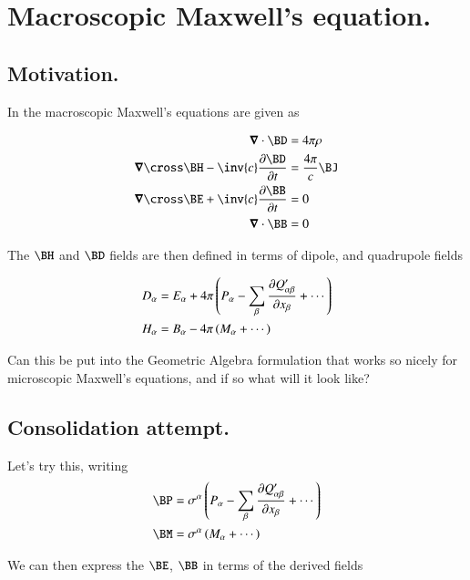 \chapter{Macroscopic Maxwell's equation.}
\label{chap:macroscopicMaxwell}
\date{ May 28, 2009.  $RCSfile: macroscopicMaxwell.tex,v $ Last $Revision: 1.8 $ $Date: 2009/06/14 17:59:59 $ }

\section{Motivation. }

In \cite{jackson1975cew} the macroscopic Maxwell's equations are given as

\begin{align}\label{eqn:macroMax:MaxwellMixedFields}
\spacegrad \cdot \BD &= 4 \pi \rho \\
\spacegrad \cross \BH - \inv{c} \PD{t}{\BD} &= \frac{4 \pi}{c} \BJ \\
\spacegrad \cross \BE + \inv{c} \PD{t}{\BB} &= 0 \\
\spacegrad \cdot \BB &= 0
\end{align}

The $\BH$ and $\BD$ fields are then defined in terms of dipole, and quadrupole
fields

\begin{align}\label{eqn:macroMax:dipoleCoordinates}
D_\alpha &= E_\alpha + 4\pi \left( P_\alpha - \sum_\beta \PD{x_\beta}{Q'_{\alpha\beta}} + \cdots\right) \\
H_\alpha &= B_\alpha - 4\pi \left( M_\alpha + \cdots\right)
\end{align}

Can this be put into the Geometric Algebra formulation that works so
nicely for microscopic Maxwell's equations, and if so what will it look like?

\section{Consolidation attempt. }

Let's try this, writing
\begin{align}
\BP &= \sigma^\alpha \left( P_\alpha - \sum_\beta \PD{x_\beta}{Q'_{\alpha\beta}} + \cdots\right) \\
\BM &= \sigma^\alpha \left( M_\alpha + \cdots \right)
\end{align}

We can then express the $\BE$, $\BB$ in terms of the derived fields


